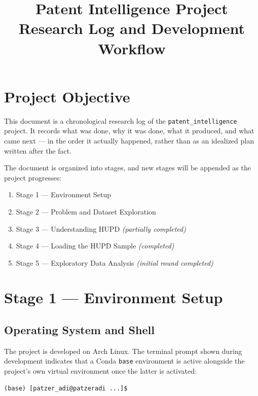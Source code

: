 \documentclass[11pt]{article}
\title{\textbf{Patent Intelligence Project} \\ \large Research Log and Development Workflow}
\author{}
\date{}
\begin{document}
\maketitle
\tableofcontents
\newpage

\section{Project Objective}

This document is a chronological research log of the \texttt{patent\_intelligence} project. It records what was done, why it was done, what it produced, and what came next --- in the order it actually happened, rather than as an idealized plan written after the fact.

The document is organized into stages, and new stages will be appended as the project progresses:

\begin{enumerate}
    \item Stage 1 --- Environment Setup
    \item Stage 2 --- Problem and Dataset Exploration
    \item Stage 3 --- Understanding HUPD \textit{(partially completed)}
    \item Stage 4 --- Loading the HUPD Sample \textit{(completed)}
    \item Stage 5 --- Exploratory Data Analysis \textit{(initial round completed)}
\end{enumerate}

\section{Stage 1 --- Environment Setup}

\subsection{Operating System and Shell}

The project is developed on Arch Linux. The terminal prompt shown during development indicates that a Conda \texttt{base} environment is active alongside the project's own virtual environment once the latter is activated:

\begin{lstlisting}
(base) [patzer_adi@patzeradi ...]$
\end{lstlisting}
\end{document}
